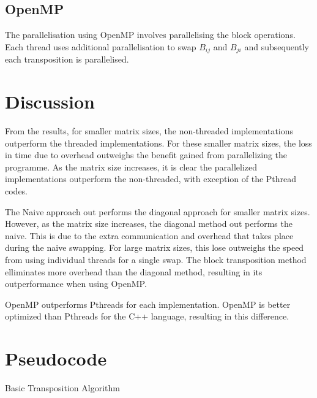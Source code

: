 \documentclass[a4paper,10pt]{article}
\begin{document}
\subsection{OpenMP}
The parallelisation using OpenMP involves parallelising the block operations. Each thread uses additional parallelisation to swap $B_{ij}$ and $B_{ji}$ and subsequently each transposition is parallelised. 

\section{Discussion}

From the results, for smaller matrix sizes, the non-threaded implementations outperform the threaded implementations.
For these smaller matrix sizes, the loss in time due to overhead outweighs the benefit gained from parallelizing the programme.
As the matrix size increases, it is clear the parallelized implementations outperform the non-threaded, with exception of the Pthread codes.

The Naive approach out performs the diagonal approach for smaller matrix sizes.
However, as the matrix size increases, the diagonal method out performs the naive.
This is due to the extra communication and overhead that takes place during the naive swapping.
For large matrix sizes, this lose outweighs the speed from using individual threads for a single swap.
The block transposition method elliminates more overhead than the diagonal method, resulting in its outperformance when using OpenMP.

OpenMP outperforms Pthreads for each implementation.
OpenMP is better optimized than Pthreads for the C++ language, resulting in this difference.

\section{Pseudocode}


\begin{algorithm}[H]
	\SetAlgoLined
\caption{Basic Transposition Algorithm}
\end{algorithm}
\end{document}
